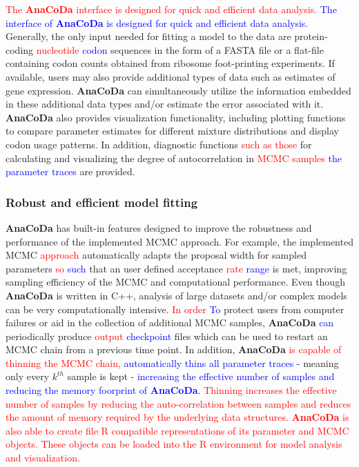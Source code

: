 \documentclass{bioinfo}
\newcommand{\package}{\textbf{AnaCoDa }} %
\newcommand{\packagee}{\textbf{AnaCoDa}}
\begin{document}
\textcolor{red}{The \package interface is designed for quick and efficient data analysis.}
\textcolor{blue}{The interface of \package is designed for quick and efficient data analysis.}
Generally, the only input needed for fitting a model to the data are protein-coding \textcolor{red}{nucleotide} \textcolor{blue}{codon} sequences in the form of a FASTA file or a flat-file containing codon counts obtained from ribosome foot-printing experiments. 
If available, users may also provide additional types of data such as estimates of gene expression.
\package can simultaneously utilize the information embedded in these additional data types and/or estimate the error associated with it.
\package also provides visualization functionality, including plotting functions to compare parameter estimates for different mixture distributions and display codon usage patterns. 
In addition, diagnostic functions \textcolor{red}{such as those} for calculating and visualizing the degree of autocorrelation in \textcolor{red}{MCMC samples} \textcolor{blue}{the parameter traces} are provided.

\subsubsection*{Robust and efficient model fitting}
\package has built-in features designed to improve the robustness and performance of the implemented MCMC approach. 
For example, the implemented MCMC \textcolor{red}{approach} automatically adapts the proposal width for sampled parameters \textcolor{red}{so} \textcolor{blue}{such} that an user defined acceptance \textcolor{red}{rate} \textcolor{blue}{range} is met, improving sampling efficiency of the MCMC and computational performance.
Even though \package is written in C++, analysis of large datasets and/or complex models can be very computationally intensive.
\textcolor{red}{In order} \textcolor{blue}{To} protect users from computer failures or aid in the collection of additional MCMC samples, \package \textcolor{blue}{can} periodically produce \textcolor{red}{output} \textcolor{blue}{checkpoint} files which can be used to restart an MCMC chain from a previous time point.
In addition, \package \textcolor{red}{is capable of thinning the MCMC chain,} \textcolor{blue}{automatically thins all parameter traces - } meaning only every $k^{th}$ sample is kept \textcolor{blue}{ - increasing the effective number of samples and reducing the memory foorprint of \packagee}. 
\textcolor{red}{Thinning increases the effective number of samples by reducing the auto-correlation between samples and reduces the amount of memory required by the underlying data structures.
\package is also able to create file R compatible representations of its parameter and MCMC objects.
These objects can be loaded into the R environment for model analysis and visualization.}
\end{document}
